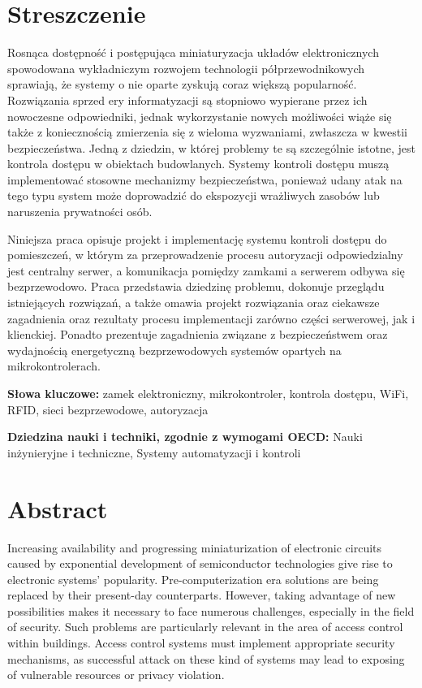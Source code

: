 \section*{Streszczenie}

	Rosnąca dostępność i postępująca miniaturyzacja układów elektronicznych spowodowana wykładniczym rozwojem technologii półprzewodnikowych sprawiają, że systemy o nie oparte zyskują coraz większą popularność. Rozwiązania sprzed ery informatyzacji są stopniowo wypierane przez ich nowoczesne odpowiedniki, jednak wykorzystanie nowych możliwości wiąże się także z koniecznością zmierzenia się z wieloma wyzwaniami, zwłaszcza w kwestii bezpieczeństwa. Jedną z dziedzin, w której problemy te są szczególnie istotne, jest kontrola dostępu w obiektach budowlanych. Systemy kontroli dostępu muszą implementować stosowne mechanizmy bezpieczeństwa, ponieważ udany atak na tego typu system może doprowadzić do ekspozycji wrażliwych zasobów lub naruszenia prywatności osób.

	Niniejsza praca opisuje projekt i implementację systemu kontroli dostępu do pomieszczeń, w którym za przeprowadzenie procesu autoryzacji odpowiedzialny jest centralny serwer, a komunikacja pomiędzy zamkami a serwerem odbywa się bezprzewodowo. Praca przedstawia dziedzinę problemu, dokonuje przeglądu istniejących rozwiązań, a także omawia projekt rozwiązania oraz ciekawsze zagadnienia oraz rezultaty procesu implementacji zarówno części serwerowej, jak i klienckiej. Ponadto prezentuje zagadnienia związane z bezpieczeństwem oraz wydajnością energetyczną bezprzewodowych systemów opartych na mikrokontrolerach.

	\textbf{Słowa kluczowe:} zamek elektroniczny, mikrokontroler, kontrola dostępu, WiFi, RFID, sieci bezprzewodowe, autoryzacja

	\textbf{Dziedzina nauki i techniki, zgodnie z wymogami OECD:} Nauki inżynieryjne i techniczne, Systemy automatyzacji i kontroli

\section*{Abstract}

	Increasing availability and progressing miniaturization of electronic circuits caused by exponential development of semiconductor technologies give rise to electronic systems' popularity. Pre-computerization era solutions are being replaced by their present-day counterparts. However, taking advantage of new possibilities makes it necessary to face numerous challenges, especially in the field of security. Such problems are particularly relevant in the area of access control within buildings. Access control systems must implement appropriate security mechanisms, as successful attack on these kind of systems may lead to exposing of vulnerable resources or privacy violation.

